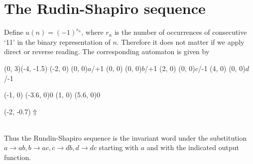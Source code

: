 \documentclass{article}
\begin{document}
\section*{The Rudin-Shapiro sequence}
Define $u(n) = (-1)^{r_n}$, where $r_n$ is the number of occurrences of
consecutive `11' in the binary representation of $n$. Therefore it does not 
matter if we apply direct or reverse reading. The corresponding automaton is
given by\\
\begin{graph}(0, 3)(-4, -1.5)
  (-2, 0) (0, 0){\bs$a$/+1\es}
  (0, 0)  (0, 0){\bs$b$/+1\es}
  (2, 0)  (0, 0){\bs$c$/-1\es}
  (4, 0)  (0, 0){\bs$d$/-1\es}

  (-1, 0) \freetext(-3.6, 0){0}
   
   
   
   
   
  (1, 0) \freetext(5.6, 0){0}
   

  \freetext(-2, -0.7){$\Uparrow$}
\end{graph}\\
Thus the Rundin-Shapiro sequence is the invariant word under the substitution
$a \rightarrow ab, b \rightarrow ac, c \rightarrow db, d \rightarrow dc$
starting with $a$ and with the indicated output function.
\end{document}
